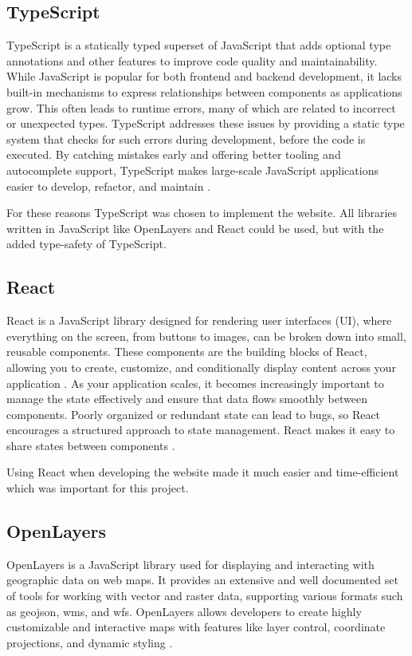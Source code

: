 \subsection{TypeScript}
TypeScript is a statically typed superset of JavaScript that adds optional type annotations and other features to improve code quality and maintainability. While JavaScript is popular for both frontend and backend development, it lacks built-in mechanisms to express relationships between components as applications grow. This often leads to runtime errors, many of which are related to incorrect or unexpected types. TypeScript addresses these issues by providing a static type system that checks for such errors during development, before the code is executed. By catching mistakes early and offering better tooling and autocomplete support, TypeScript makes large-scale JavaScript applications easier to develop, refactor, and maintain \cite{typescript_handbook}. 

For these reasons TypeScript was chosen to implement the website. All libraries written in JavaScript like OpenLayers and React could be used, but with the added type-safety of TypeScript.

\subsection{React}
React is a JavaScript library designed for rendering user interfaces (UI), where everything on the screen, from buttons to images, can be broken down into small, reusable components. These components are the building blocks of React, allowing you to create, customize, and conditionally display content across your application \cite{react_component}. As your application scales, it becomes increasingly important to manage the state effectively and ensure that data flows smoothly between components. Poorly organized or redundant state can lead to bugs, so React encourages a structured approach to state management. React makes it easy to share states between components \cite{react_state}. 

Using React when developing the website made it much easier and time-efficient which was important for this project. 

\subsection{OpenLayers}
OpenLayers is a JavaScript library used for displaying and interacting with geographic data on web maps. It provides an extensive and well documented set of tools for working with vector and raster data, supporting various formats such as \Gls{geojson}, \Gls{wms}, and \Gls{wfs}. OpenLayers allows developers to create highly customizable and interactive maps with features like layer control, coordinate projections, and dynamic styling \cite{openlayers}.

